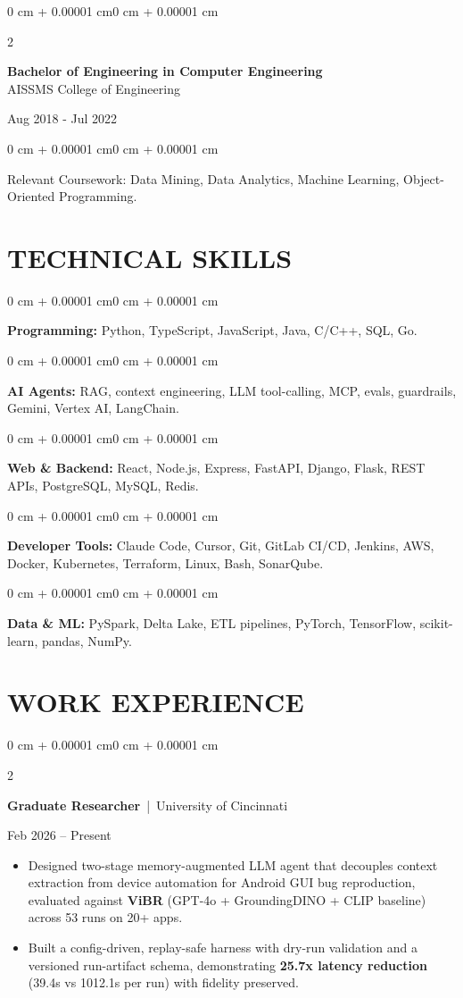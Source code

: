 \documentclass[10pt, letterpaper]{article}
\newenvironment{highlights}{
    \begin{itemize}[
        topsep=0.10 cm,
        parsep=0.06 cm,
        partopsep=0pt,
        itemsep=0.06 cm,
        leftmargin=12pt
    ]
}{
    \end{itemize}
}
\newenvironment{onecolentry}{
    \begin{adjustwidth}{0 cm + 0.00001 cm}{0 cm + 0.00001 cm}
}{
    \end{adjustwidth}
}
\newenvironment{twocolentry}[2][]{
    \onecolentry
    \def\secondColumn{#2}
    \setcolumnwidth{\fill, 4.5 cm}
    \begin{paracol}{2}
}{
    \switchcolumn \raggedleft \secondColumn
    \end{paracol}
    \endonecolentry
}
\begin{document}
\begin{twocolentry}{
    Aug 2018 - Jul 2022
}
    \textbf{Bachelor of Engineering in Computer Engineering} \\
    AISSMS College of Engineering
\end{twocolentry}
\begin{onecolentry}
Relevant Coursework: Data Mining, Data Analytics, Machine Learning, Object-Oriented Programming.
\end{onecolentry}
\section{TECHNICAL SKILLS}
\begin{onecolentry}
\textbf{Programming:} Python, TypeScript, JavaScript, Java, C/C++, SQL, Go.
\end{onecolentry}
\vspace{0.06 cm}
\begin{onecolentry}
\textbf{AI Agents:} RAG, context engineering, LLM tool-calling, MCP, evals, guardrails, Gemini, Vertex AI, LangChain.
\end{onecolentry}
\vspace{0.06 cm}
\begin{onecolentry}
\textbf{Web \& Backend:} React, Node.js, Express, FastAPI, Django, Flask, REST APIs, PostgreSQL, MySQL, Redis.
\end{onecolentry}
\vspace{0.06 cm}
\begin{onecolentry}
\textbf{Developer Tools:} Claude Code, Cursor, Git, GitLab CI/CD, Jenkins, AWS, Docker, Kubernetes, Terraform, Linux, Bash, SonarQube.
\end{onecolentry}
\vspace{0.06 cm}
\begin{onecolentry}
\textbf{Data \& ML:} PySpark, Delta Lake, ETL pipelines, PyTorch, TensorFlow, scikit-learn, pandas, NumPy.
\end{onecolentry}

\section{WORK EXPERIENCE}
\begin{twocolentry}{Feb 2026 -- Present}
\textbf{Graduate Researcher} \,|\, University of Cincinnati
\end{twocolentry}
\begin{highlights}
  \item Designed two-stage memory-augmented LLM agent that decouples context extraction from device automation for Android GUI bug reproduction, evaluated against \textbf{ViBR} (GPT-4o + GroundingDINO + CLIP baseline) across 53 runs on 20+ apps.
  \item Built a config-driven, replay-safe harness with dry-run validation and a versioned run-artifact schema, demonstrating \textbf{25.7x latency reduction} (39.4s vs 1012.1s per run) with fidelity preserved.
\end{highlights}
\end{document}
